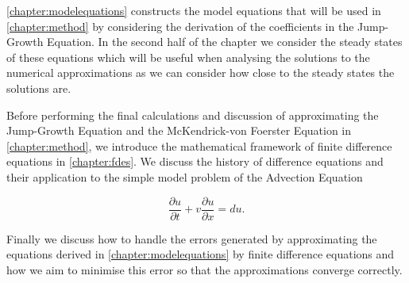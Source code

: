 \documentclass[../main]{subfiles}
\begin{document}
  \autoref{chapter:modelequations} constructs the model equations that will be used in \autoref{chapter:method} by considering the derivation of the coefficients in the Jump-Growth Equation. In the second half of the chapter we consider the steady states of these equations which will be useful when analysing the solutions to the numerical approximations as we can consider how close to the steady states the solutions are.

  Before performing the final calculations and discussion of approximating the Jump-Growth Equation and the McKendrick-von Foerster Equation in \autoref{chapter:method}, we introduce the mathematical framework of finite difference equations in \autoref{chapter:fdes}. We discuss the history of difference equations and their application to the simple model problem of the Advection Equation

  \begin{equation}
    \frac{\partial u}{\partial t} + v \frac{\partial u}{\partial x} = d u.
  \end{equation}

  Finally we discuss how to handle the errors generated by approximating the equations derived in \autoref{chapter:modelequations} by finite difference equations and how we aim to minimise this error so that the approximations converge correctly.
\end{document}
